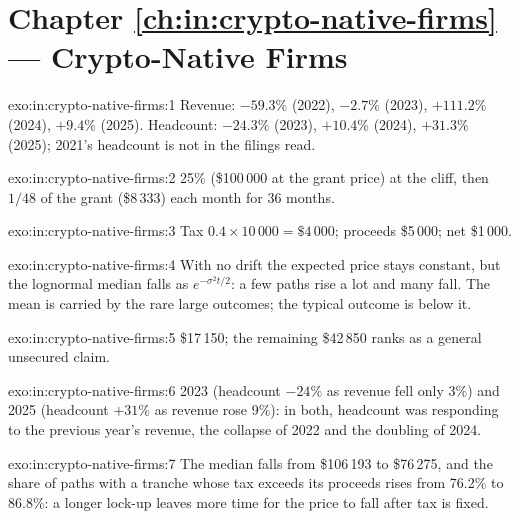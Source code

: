 \section*{Chapter \ref{ch:in:crypto-native-firms} --- Crypto-Native Firms}

\begin{solution}{exo:in:crypto-native-firms:1}
Revenue: $-59.3\%$ (2022), $-2.7\%$ (2023), $+111.2\%$ (2024), $+9.4\%$ (2025). Headcount: $-24.3\%$ (2023), $+10.4\%$
(2024), $+31.3\%$ (2025); 2021's headcount is not in the filings read.
\end{solution}

\begin{solution}{exo:in:crypto-native-firms:2}
25\% (\$100\,000 at the grant price) at the cliff, then $1/48$ of the grant (\$8\,333) each month for 36 months.
\end{solution}

\begin{solution}{exo:in:crypto-native-firms:3}
Tax $0.4\times10\,000=\$4\,000$; proceeds \$5\,000; net \$1\,000.
\end{solution}

\begin{solution}{exo:in:crypto-native-firms:4}
With no drift the expected price stays constant, but the lognormal median falls as $e^{-\sigma^2t/2}$: a few paths rise a
lot and many fall. The mean is carried by the rare large outcomes; the typical outcome is below it.
\end{solution}

\begin{solution}{exo:in:crypto-native-firms:5}
\$17\,150; the remaining \$42\,850 ranks as a general unsecured claim.
\end{solution}

\begin{solution}{exo:in:crypto-native-firms:6}
2023 (headcount $-24\%$ as revenue fell only 3\%) and 2025 (headcount $+31\%$ as revenue rose 9\%): in both, headcount was
responding to the previous year's revenue, the collapse of 2022 and the doubling of 2024.
\end{solution}

\begin{solution}{exo:in:crypto-native-firms:7}
The median falls from \$106\,193 to \$76\,275, and the share of paths with a tranche whose tax exceeds its proceeds rises
from 76.2\% to 86.8\%: a longer lock-up leaves more time for the price to fall after tax is fixed.
\end{solution}

